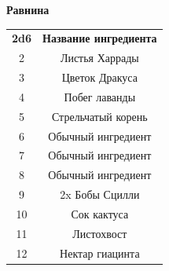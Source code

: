 \documentclass[a4paper, 9pt, twocolumn]{book}
\begin{document}
	\begin{table}[H]
		
		{\Large \textbf{Равнина}}
		
		\medspace 
		
		\centering 
		
		\begin{tabularx}{\linewidth}{c C}
			
			\textbf{2d6} & \textbf{Название ингредиента} \\
			
			2 & Листья Харрады  \\
			
			3 & Цветок Дракуса  \\
			
			4 & Побег лаванды  \\
			
			5 & Стрельчатый корень  \\
			
			6 & Обычный ингредиент \\
			
			7 & Обычный ингредиент \\
			
			8 & Обычный ингредиент \\
			
			9 & 2x Бобы Сцилли \\
			
			10 & Сок кактуса  \\
			
			11 & Листохвост  \\
			
			12 & Нектар гиацинта
		\end{tabularx}
	\end{table}
\end{document}

